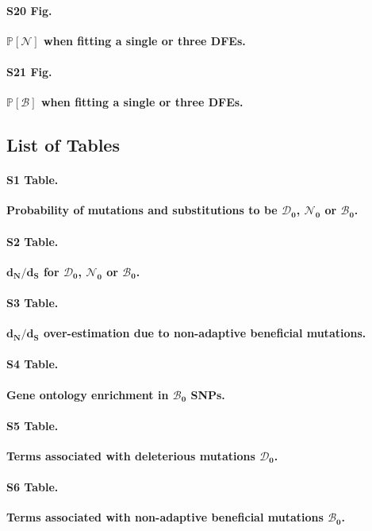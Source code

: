 \documentclass[10pt,letterpaper]{article}
\newcommand{\proba}{\mathbb{P}}
\newcommand{\dn}{d_N}
\newcommand{\ds}{d_S}
\newcommand{\dnds}{\dn / \ds}
\newcommand{\SphyDel}{\mathcal{D}_0}
\newcommand{\SphyNeu}{\mathcal{N}_0}
\newcommand{\SphyBen}{\mathcal{B}_0}
\newcommand{\SpopNeu}{\mathcal{N}}
\newcommand{\SpopBen}{\mathcal{B}}
\begin{document}
\paragraph*{S20 Fig.}
\label{S20_Fig}
{\bf $\bm{\proba [ \SpopNeu ]}$ when fitting a single or three DFEs.}

\paragraph*{S21 Fig.}
\label{S21_Fig}
{\bf $\bm{\proba [ \SpopBen ]}$ when fitting a single or three DFEs.}


\newpage
\subsection*{List of Tables}
\paragraph*{S1 Table.}
\label{S1_Table}
{\bf Probability of mutations and substitutions to be $\bm{\SphyDel}$, $\bm{\SphyNeu}$ or $\bm{\SphyBen}$.}

\paragraph*{S2 Table.}
\label{S2_Table}
{\bf $\bm{\dnds}$ for $\bm{\SphyDel}$, $\bm{\SphyNeu}$ or $\bm{\SphyBen}$.}

\paragraph*{S3 Table.}
\label{S3_Table}
{\bf $\bm{\dnds}$ over-estimation due to non-adaptive beneficial mutations.}

\paragraph*{S4 Table.}
\label{S4_Table}
{\bf Gene ontology enrichment in $\bm{\SphyBen}$ SNPs.}

\paragraph*{S5 Table.}
\label{S5_Table}
{\bf Terms associated with deleterious mutations $\bm{\SphyDel}$.}

\paragraph*{S6 Table.}
\label{S6_Table}
{\bf Terms associated with non-adaptive beneficial mutations $\bm{\SphyBen}$.}
\end{document}
